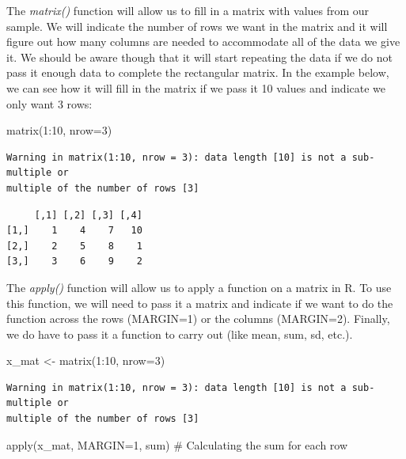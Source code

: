 \documentclass[
  letterpaper,
  DIV=11,
  numbers=noendperiod]{scrreprt}
\newenvironment{Shaded}{\begin{snugshade}}{\end{snugshade}}
\newcommand{\AttributeTok}[1]{\textcolor[rgb]{0.40,0.45,0.13}{#1}}
\newcommand{\CommentTok}[1]{\textcolor[rgb]{0.37,0.37,0.37}{#1}}
\newcommand{\DecValTok}[1]{\textcolor[rgb]{0.68,0.00,0.00}{#1}}
\newcommand{\FunctionTok}[1]{\textcolor[rgb]{0.28,0.35,0.67}{#1}}
\newcommand{\NormalTok}[1]{\textcolor[rgb]{0.00,0.23,0.31}{#1}}
\newcommand{\OtherTok}[1]{\textcolor[rgb]{0.00,0.23,0.31}{#1}}
\newcommand{\SpecialCharTok}[1]{\textcolor[rgb]{0.37,0.37,0.37}{#1}}
\begin{document}
The \emph{matrix()} function will allow us to fill in a matrix with
values from our sample. We will indicate the number of rows we want in
the matrix and it will figure out how many columns are needed to
accommodate all of the data we give it. We should be aware though that
it will start repeating the data if we do not pass it enough data to
complete the rectangular matrix. In the example below, we can see how it
will fill in the matrix if we pass it 10 values and indicate we only
want 3 rows:

\begin{Shaded}
\begin{Highlighting}[]
\FunctionTok{matrix}\NormalTok{(}\DecValTok{1}\SpecialCharTok{:}\DecValTok{10}\NormalTok{, }\AttributeTok{nrow=}\DecValTok{3}\NormalTok{)}
\end{Highlighting}
\end{Shaded}

\begin{verbatim}
Warning in matrix(1:10, nrow = 3): data length [10] is not a sub-multiple or
multiple of the number of rows [3]
\end{verbatim}

\begin{verbatim}
     [,1] [,2] [,3] [,4]
[1,]    1    4    7   10
[2,]    2    5    8    1
[3,]    3    6    9    2
\end{verbatim}

The \emph{apply()} function will allow us to apply a function on a
matrix in R. To use this function, we will need to pass it a matrix and
indicate if we want to do the function across the rows (MARGIN=1) or the
columns (MARGIN=2). Finally, we do have to pass it a function to carry
out (like mean, sum, sd, etc.).

\begin{Shaded}
\begin{Highlighting}[]
\NormalTok{x\_mat }\OtherTok{\textless{}{-}} \FunctionTok{matrix}\NormalTok{(}\DecValTok{1}\SpecialCharTok{:}\DecValTok{10}\NormalTok{, }\AttributeTok{nrow=}\DecValTok{3}\NormalTok{)}
\end{Highlighting}
\end{Shaded}

\begin{verbatim}
Warning in matrix(1:10, nrow = 3): data length [10] is not a sub-multiple or
multiple of the number of rows [3]
\end{verbatim}

\begin{Shaded}
\begin{Highlighting}[]
\FunctionTok{apply}\NormalTok{(x\_mat, }\AttributeTok{MARGIN=}\DecValTok{1}\NormalTok{, sum) }\CommentTok{\# Calculating the sum for each row}
\end{Highlighting}
\end{Shaded}
\end{document}
